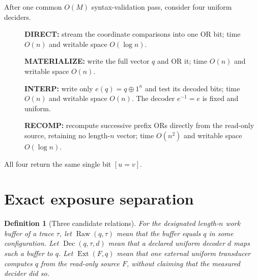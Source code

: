 \documentclass[11pt]{article}
\newtheorem{definition}{Definition}
\begin{document}
After one common $O(M)$ syntax-validation pass, consider four uniform
deciders.
\begin{description}
\item[] \textbf{DIRECT:} stream the coordinate comparisons into one OR bit;
time $O(n)$ and writable space $O(\log n)$.
\item[] \textbf{MATERIALIZE:} write the full vector $q$ and OR it; time
$O(n)$ and writable space $O(n)$.
\item[] \textbf{INTERP:} write only $e(q)=q\oplus1^n$ and test its decoded
bits; time $O(n)$ and writable space $O(n)$.  The decoder $e^{-1}=e$ is fixed
and uniform.
\item[] \textbf{RECOMP:} recompute successive prefix ORs directly from the
read-only source, retaining no length-$n$ vector; time $O(n^2)$ and writable
space $O(\log n)$.
\end{description}
All four return the same single bit $[u=v]$.

\section{Exact exposure separation}
\begin{definition}[Three candidate relations]
For the designated length-$n$ work buffer of a trace $\tau$, let
$\operatorname{Raw}(q,\tau)$ mean that the buffer equals $q$ in some
configuration.  Let $\operatorname{Dec}(q,\tau,d)$ mean that a declared
uniform decoder $d$ maps such a buffer to $q$.  Let
$\operatorname{Ext}(F,q)$ mean that one external uniform transducer computes
$q$ from the read-only source $F$, without claiming that the measured decider
did so.
\end{definition}
\end{document}

